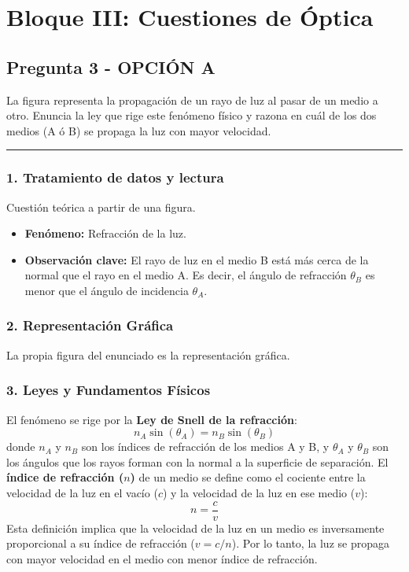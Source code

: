 \newpage

\section{Bloque III: Cuestiones de Óptica}
\label{sec:optica_2003_sep_ext}

\subsection{Pregunta 3 - OPCIÓN A}
\label{subsec:3A_2003_sep_ext}

\begin{cajaenunciado}
La figura representa la propagación de un rayo de luz al pasar de un medio a otro. Enuncia la ley que rige este fenómeno físico y razona en cuál de los dos medios (A ó B) se propaga la luz con mayor velocidad.
\end{cajaenunciado}
\hrule

\subsubsection*{1. Tratamiento de datos y lectura}
Cuestión teórica a partir de una figura.
\begin{itemize}
    \item \textbf{Fenómeno:} Refracción de la luz.
    \item \textbf{Observación clave:} El rayo de luz en el medio B está más cerca de la normal que el rayo en el medio A. Es decir, el ángulo de refracción $\theta_B$ es menor que el ángulo de incidencia $\theta_A$.
\end{itemize}

\subsubsection*{2. Representación Gráfica}
La propia figura del enunciado es la representación gráfica.

\subsubsection*{3. Leyes y Fundamentos Físicos}
El fenómeno se rige por la \textbf{Ley de Snell de la refracción}:
$$n_A \sin(\theta_A) = n_B \sin(\theta_B)$$
donde $n_A$ y $n_B$ son los índices de refracción de los medios A y B, y $\theta_A$ y $\theta_B$ son los ángulos que los rayos forman con la normal a la superficie de separación.
El \textbf{índice de refracción ($n$)} de un medio se define como el cociente entre la velocidad de la luz en el vacío ($c$) y la velocidad de la luz en ese medio ($v$):
$$n = \frac{c}{v}$$
Esta definición implica que la velocidad de la luz en un medio es inversamente proporcional a su índice de refracción ($v = c/n$). Por lo tanto, la luz se propaga con mayor velocidad en el medio con menor índice de refracción.

